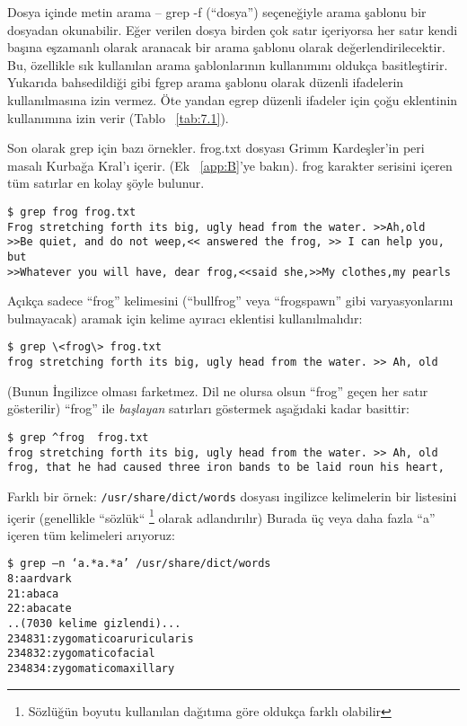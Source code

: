 \begin{section}{Dosya içinde metin arama – grep}
-f (“dosya”) seçeneğiyle arama şablonu bir dosyadan okunabilir. Eğer verilen dosya birden çok satır içeriyorsa her satır kendi başına eşzamanlı olarak aranacak bir arama şablonu olarak değerlendirilecektir. Bu, özellikle sık kullanılan arama şablonlarının kullanımını oldukça basitleştirir.
Yukarıda bahsedildiği gibi fgrep arama şablonu olarak düzenli ifadelerin kullanılmasına izin vermez. Öte yandan egrep düzenli ifadeler için çoğu eklentinin kullanımına izin verir (Tablo ~\ref{tab:7.1}).

Son olarak grep için bazı örnekler. frog.txt dosyası Grimm Kardeşler'in peri masalı Kurbağa Kral'ı içerir. (Ek ~\ref{app:B}’ye bakın). frog karakter serisini içeren tüm satırlar en kolay şöyle bulunur.
\footnotesize
\begin{verbatim}
$ grep frog frog.txt
Frog stretching forth its big, ugly head from the water. >>Ah,old
>>Be quiet, and do not weep,<< answered the frog, >> I can help you, but
>>Whatever you will have, dear frog,<<said she,>>My clothes,my pearls
\end{verbatim}
\normalsize

Açıkça sadece “frog” kelimesini (“bullfrog” veya “frogspawn” gibi varyasyonlarını bulmayacak) aramak için kelime ayıracı eklentisi kullanılmalıdır:

\footnotesize
\begin{verbatim}
$ grep \<frog\> frog.txt
frog stretching forth its big, ugly head from the water. >> Ah, old
\end{verbatim}
\normalsize

(Bunun İngilizce olması farketmez. Dil ne olursa olsun “frog” geçen her satır gösterilir) “frog” ile \textit{başlayan} satırları göstermek aşağıdaki kadar basittir:
\footnotesize
\begin{verbatim}
$ grep ^frog  frog.txt
frog stretching forth its big, ugly head from the water. >> Ah, old
frog, that he had caused three iron bands to be laid roun his heart,
\end{verbatim}
\normalsize

Farklı bir örnek: \verb|/usr/share/dict/words| dosyası ingilizce kelimelerin bir listesini içerir (genellikle “sözlük“ \footnote{Sözlüğün boyutu kullanılan dağıtıma göre oldukça farklı olabilir} olarak adlandırılır) Burada üç veya daha fazla “a” içeren tüm kelimeleri arıyoruz:

\footnotesize
\begin{verbatim}
$ grep –n ‘a.*a.*a’ /usr/share/dict/words
8:aardvark
21:abaca
22:abacate
..(7030 kelime gizlendi)...
234831:zygomaticoaruricularis
234832:zygomaticofacial
234834:zygomaticomaxillary
\end{verbatim}
\normalsize


\end{section}
